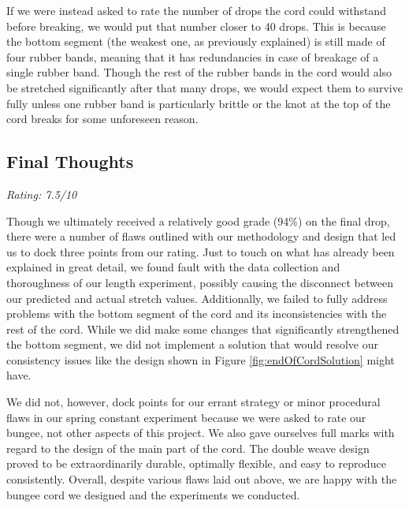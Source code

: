 \documentclass[12pt]{article}
\begin{document}
If we were instead asked to rate the number of drops the cord could withstand before breaking, we would put that number closer to 40 drops. This is because the bottom segment (the weakest one, as previously explained) is still made of four rubber bands, meaning that it has redundancies in case of breakage of a single rubber band. Though the rest of the rubber bands in the cord would also be stretched significantly after that many drops, we would expect them to survive fully unless one rubber band is particularly brittle or the knot at the top of the cord breaks for some unforeseen reason.

\subsection{Final Thoughts}
\textit{Rating: 7.5/10}
\newline

Though we ultimately received a relatively good grade (94\%) on the final drop, there were a number of flaws outlined with our methodology and design that led us to dock three points from our rating. Just to touch on what has already been explained in great detail, we found fault with the data collection and thoroughness of our length experiment, possibly causing the disconnect between our predicted and actual stretch values. Additionally, we failed to fully address problems with the bottom segment of the cord and its inconsistencies with the rest of the cord. While we did make some changes that significantly strengthened the bottom segment, we did not implement a solution that would resolve our consistency issues like the design shown in Figure \ref{fig:endOfCordSolution} might have.
\newline

We did not, however, dock points for our errant strategy or minor procedural flaws in our spring constant experiment because we were asked to rate our bungee, not other aspects of this project. We also gave ourselves full marks with regard to the design of the main part of the cord. The double weave design proved to be extraordinarily durable, optimally flexible, and easy to reproduce consistently. Overall, despite various flaws laid out above, we are happy with the bungee cord we designed and the experiments we conducted.
\end{document}
